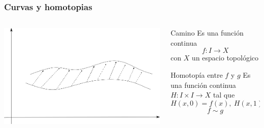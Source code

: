\documentclass[xetex,mathserif,serif]{beamer}
\begin{document}
  \begin{frame}
    \frametitle{Curvas y homotopias}
    \begin{columns}

      \begin{column}{.5\textwidth}
        \begin{center}
          \includegraphics[scale=0.3]{../tesis/imagenes/homotopia.png}
        \end{center}
      \end{column}

      \begin{column}{.5\textwidth}
        \begin{block}{Camino}
          Es una función continua \[ f : I \to X \] con \(X\) un espacio
          topológico
        \end{block}

        \begin{block}{Homotopía entre \(f\) y \(g\)}
          Es una función continua \(H : I \times I \to X\) tal que
          \[ H(x,0) = f(x),\ H(x,1) = g(x) \]
          \[ f \sim g \]
        \end{block}
      \end{column}
    \end{columns}
  \end{frame}
\end{document}
